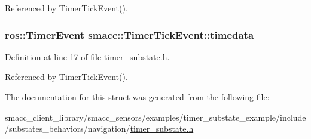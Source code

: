 Referenced by Timer\+Tick\+Event().

\subsubsection[{\texorpdfstring{timedata}{timedata}}]{\setlength{\rightskip}{0pt plus 5cm}ros\+::\+Timer\+Event smacc\+::\+Timer\+Tick\+Event\+::timedata}\hypertarget{structsmacc_1_1TimerTickEvent_afac83d8b00999b26c2365932030389e9}{}\label{structsmacc_1_1TimerTickEvent_afac83d8b00999b26c2365932030389e9}


Definition at line 17 of file timer\+\_\+substate.\+h.



Referenced by Timer\+Tick\+Event().



The documentation for this struct was generated from the following file\+:\begin{DoxyCompactItemize}
\item 
smacc\+\_\+client\+\_\+library/smacc\+\_\+sensors/examples/timer\+\_\+substate\+\_\+example/include/substates\+\_\+behaviors/navigation/\hyperlink{timer__substate_8h}{timer\+\_\+substate.\+h}\end{DoxyCompactItemize}

